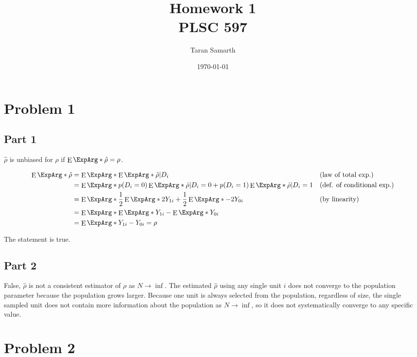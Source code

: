 \documentclass[12pt]{article}
\DeclareMathOperator{\ExpOp}{E}
\newcommand{\E}{\ExpOp\ExpArg*}
\begin{document}
\title{Homework 1 \\
        \large PLSC 597}

\author{Taran Samarth}
\date{\today}
\maketitle

\onehalfspacing

\section*{Problem 1}

\subsection*{Part 1}

$\hat{\rho}$ is unbiased for $\rho$ if $\E{\hat{\rho}} = \rho$.

\begin{align*}
\E{\hat{\rho}} & = \E{\E{\hat{\rho} | D_i}} && \text{(law of total exp.)} \\
& = \E{p(D_i = 0)\E{\hat{\rho} | D_i = 0} + p(D_i = 1)\E{\hat{\rho} | D_i = 1}} && \text{(def. of conditional exp.)}\\
& = \E{\frac{1}{2}\E{2Y_{1i}} + \frac{1}{2}\E{-2Y_{0i}}} && \text{(by linearity)} \\ 
& = \E{\E{Y_{1i}} - \E{Y_{0i}}} && \\
& = \E{Y_{1i} - Y_{0i}} = \rho &&
\end{align*}

The statement is true.

\subsection*{Part 2}

False, $\hat{\rho}$ is not a consistent estimator of $\rho$ as $N \rightarrow \inf$. The estimated $\hat{\rho}$ using any single unit $i$ does not converge to the population parameter because the population grows larger. Because one unit is always selected from the population, regardless of size, the single sampled unit does not contain more information about the population as $N \rightarrow \inf$, so it does not systematically converge to any specific value.

\section*{Problem 2}
\end{document}
